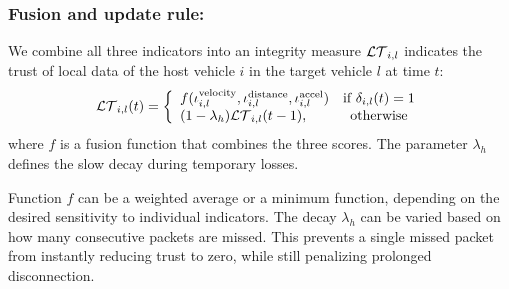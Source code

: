 \subsubsection{Fusion and update rule:}
We combine all three indicators into an integrity measure $\mathcal{LT}_{i,l}$ indicates the trust of local data of the host vehicle $i$ in the target vehicle $l$ at time $t$:
\begin{equation}
    \mathcal{LT}_{i,l}(t) = 
    \left\{ \begin{array}{lc}
        f (\iota_{i,l}^{\text{velocity}}, \iota_{i,l}^{\text{distance}} ,\iota_{i,l}^{\text{accel}})  &  \text{if } \delta_{i,l}(t) = 1 \\
        (1 - \lambda_h)\mathcal{LT}_{i,l}(t-1), & \text{otherwise}
    \end{array}\right.
\end{equation}
where $f$ is a fusion function that combines the three scores.
The parameter $\lambda_h$ defines the slow decay during temporary losses.
\begin{remark}
    Function $f$ can be a weighted average or a minimum function, depending on the desired sensitivity to individual indicators.
    The decay $\lambda_h$ can be varied based on how many consecutive packets are missed.
    This prevents a single missed packet from instantly reducing trust to zero, while still penalizing prolonged disconnection.
\end{remark}


